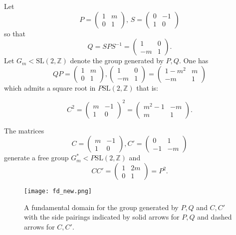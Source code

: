 \documentclass[12pt,a4paper]{amsart}
\def\ZZ{\mathbb{Z}}
\def\sl2{\mathrm{SL}(2, \ZZ)}
\def\GG{G_m}
\begin{document}
Let
$$ P = \begin{pmatrix} 1 & m \\ 0 & 1 \end{pmatrix}, \, 
S = \begin{pmatrix} 0 & -1 \\ 1 & 0 \end{pmatrix} $$
so that 
$$Q = SPS^{-1} =  \begin{pmatrix} 1 & 0 \\ -m & 1 \end{pmatrix}.$$
Let $\GG < \sl2$ denote the group generated by $P,Q$.
One has
$$ QP = 
\begin{pmatrix} 1 & m \\ 0 & 1 \end{pmatrix},\begin{pmatrix} 1 & 0 \\ -m & 1 \end{pmatrix}  
= \begin{pmatrix} 1-m^2 & m \\ -m & 1 \end{pmatrix} $$
which admits a square root in $P\sl2$ that is:

$$
C^2 = \begin{pmatrix} m & -1 \\ 1 & 0 \end{pmatrix}^2 
= \begin{pmatrix} m^2-1 & -m \\ m & 1 \end{pmatrix}.$$

The matrices 
$$
C = \begin{pmatrix} m & -1 \\ 1 & 0 \end{pmatrix},
C' = \begin{pmatrix} 0 & 1 \\ -1 & -m \end{pmatrix}
$$
generate a free group $\GG^* < P\sl2$ and 
$$CC' = \begin{pmatrix} 1 & 2m \\ 0 & 1 \end{pmatrix} = P^2.$$

\begin{figure}[ht]
\begin{center}
\texttt{[image: fd\_new.png]} 
\end{center}
\caption{A fundamental domain for the group generated by $P,Q$ and $C,C'$
with the side pairings indicated by solid arrows for $P,Q$ and dashed arrows for $C,C'$.}
	\label{fig:fund_dom}
\end{figure}
\end{document}
